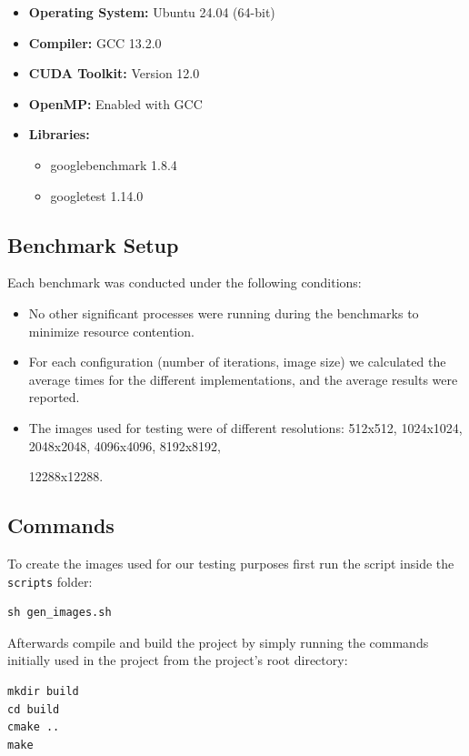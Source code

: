 \documentclass[sigconf]{acmart}
\begin{document}
    \begin{itemize}
        \item \textbf{Operating System:} Ubuntu 24.04 (64-bit)
        \item \textbf{Compiler:} GCC 13.2.0
        \item \textbf{CUDA Toolkit:} Version 12.0
        \item \textbf{OpenMP:} Enabled with GCC
        \item \textbf{Libraries:}
        \begin{itemize}
            \item googlebenchmark 1.8.4
            \item googletest 1.14.0
        \end{itemize}
    \end{itemize}

    \subsection{Benchmark Setup}
    Each benchmark was conducted under the following conditions:
    \begin{itemize}
        \item No other significant processes were running during the benchmarks to minimize resource contention.
        \item For each configuration (number of iterations, image size) we calculated the average times for the different implementations, and the average results were reported.
        \item The images used for testing were of different resolutions: 512x512, 1024x1024, 2048x2048, 4096x4096, 8192x8192,

        12288x12288.
    \end{itemize}

    \subsection{Commands}
    To create the images used for our testing purposes first run the script inside the \verb|scripts| folder:

    \begin{lstlisting}
sh gen_images.sh
    \end{lstlisting}

    Afterwards compile and build the project by simply running the commands initially used in the project from the project's root directory:

    \begin{lstlisting}
mkdir build
cd build
cmake ..
make
    \end{lstlisting}
\end{document}
